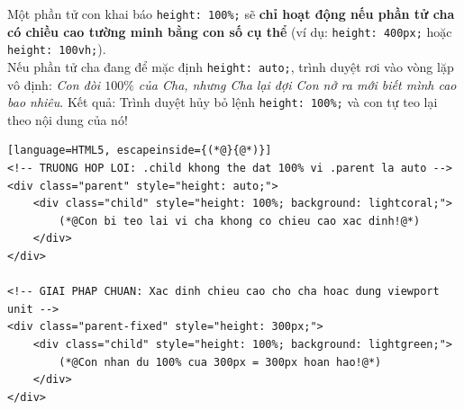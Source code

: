 \documentclass[11pt,oneside]{book}
\newcommand{\codeinline}[1]{\textcolor{accentOrange}{\texttt{#1}}}
\begin{document}
\begin{warnBox}
Một phần tử con khai báo \codeinline{height: 100\%;} sẽ \textbf{chỉ hoạt động nếu phần tử cha có chiều cao tường minh bằng con số cụ thể} (ví dụ: \codeinline{height: 400px;} hoặc \codeinline{height: 100vh;}).\\
Nếu phần tử cha đang để mặc định \codeinline{height: auto;}, trình duyệt rơi vào vòng lặp vô định: \textit{Con đòi $100\%$ của Cha, nhưng Cha lại đợi Con nở ra mới biết mình cao bao nhiêu}. Kết quả: Trình duyệt hủy bỏ lệnh \codeinline{height: 100\%;} và con tự teo lại theo nội dung của nó!
\end{warnBox}

\begin{codeWindow}
\begin{lstlisting}[language=HTML5, escapeinside={(*@}{@*)}]
<!-- TRUONG HOP LOI: .child khong the dat 100% vi .parent la auto -->
<div class="parent" style="height: auto;">
    <div class="child" style="height: 100%; background: lightcoral;">
        (*@Con bi teo lai vi cha khong co chieu cao xac dinh!@*)
    </div>
</div>

<!-- GIAI PHAP CHUAN: Xac dinh chieu cao cho cha hoac dung viewport unit -->
<div class="parent-fixed" style="height: 300px;">
    <div class="child" style="height: 100%; background: lightgreen;">
        (*@Con nhan du 100% cua 300px = 300px hoan hao!@*)
    </div>
</div>
\end{lstlisting}
\end{codeWindow}
\end{document}
